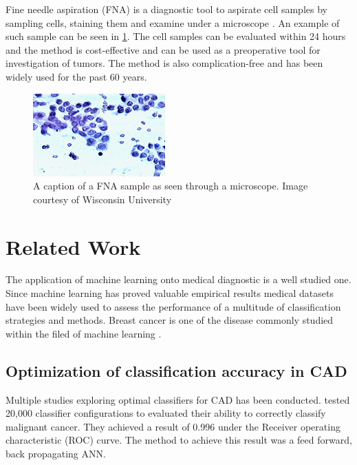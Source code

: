 Fine needle aspiration (FNA) is a diagnostic tool to aspirate cell samples by sampling cells, staining them and examine under a microscope \parencite{FNA}. An example of such sample can be seen in \ref{fig:fna_nuclei}. The cell samples can be evaluated within 24 hours and the method is cost-effective and can be used as a preoperative tool for investigation of tumors. The method is also complication-free and has been widely used for the past 60 years.

\begin{figure}[ht!]
  \centering
  \includegraphics[]{images/fna_nuclei.png}
  \caption{A caption of a FNA sample as seen through a microscope. Image courtesy of Wisconsin University}
  \label{fig:fna_nuclei}
\end{figure}



\section{Related Work}

The application of machine learning onto medical diagnostic is a well studied one. Since machine learning has proved valuable empirical results medical datasets have been widely used to assess the performance of a multitude of classification strategies and methods. Breast cancer is one of the disease commonly studied within the filed of machine learning \parencite{kononenko2001}.

\subsection{Optimization of classification accuracy in CAD}

Multiple studies exploring optimal classifiers for CAD has been conducted. \textcite{ramos2012} tested 20,000 classifier configurations to evaluated their ability to correctly classify malignant cancer. They achieved a result of 0.996 under the Receiver operating characteristic (ROC) curve. The method to achieve this result was a feed forward, back propagating ANN.

